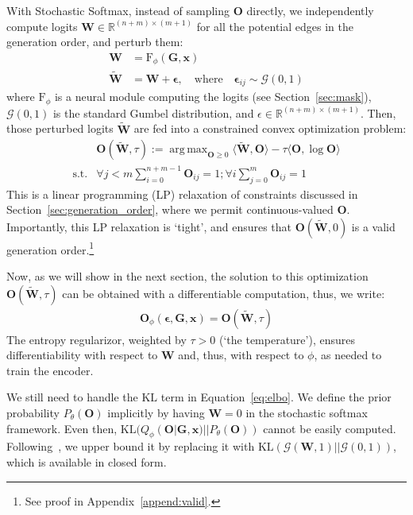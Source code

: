 \documentclass[11pt]{article}
\DeclareMathOperator*{\argmax}{arg\,max}
\begin{document}
With Stochastic Softmax, instead of sampling $\mathbf{O}$ directly, we independently compute logits $\mathbf{W} \in \mathbb{R}^{(n+m)\times(m+1)}$ for  all the potential edges in the generation order, and perturb them:
  \begin{align} \label{eq:logits}
   \mathbf{W} &= \mathrm{F}_\phi(\mathbf{G},\mathbf{x}) \\
  \widetilde{ \mathbf{W}} &=  \mathbf{W} + \mathbf{\epsilon},  \quad  \textrm{where} \quad \mathbf{\epsilon}_{ij} \sim  \mathcal{G}(0,1)
\end{align}
where $\mathrm{F}_\phi$ is a neural module computing the logits (see Section~\ref{sec:mask}), $\mathcal{G}(0,1)$ is the standard Gumbel distribution, and $\epsilon \in \mathbb{R}^{(n+m)\times(m+1)}$. Then, those perturbed logits $\widetilde{ \mathbf{W}}$ are fed into a constrained convex optimization problem:
\begin{align} \label{eq:reg}
  &\mathbf{O}(\widetilde{ \mathbf{W}},\tau) := \argmax_{  \mathbf{O} \geq 0} \langle \widetilde{ \mathbf{W}}, \mathbf{O} \rangle -\tau \langle \mathbf{O}, \log \mathbf{O} \rangle \nonumber \\
    \mbox{s.t.}  &   \forall j < m \sum_{i=0}^{n+m-1} \mathbf{O}_{ij} =1 ;\forall i \sum_{j=0}^{m} \mathbf{O}_{ij} =1
\end{align}
This is a linear programming (LP) relaxation of constraints  discussed in Section~\ref{sec:generation_order}, where we permit continuous-valued  $\mathbf{O}$. Importantly, this LP relaxation is `tight', and ensures that
 $\mathbf{O}(\widetilde{ \mathbf{W}},0) $ is a valid generation order.\footnote{See proof in Appendix~\ref{append:valid}.
 } 


Now, as we will show in the next section,
the solution to this optimization 
$\mathbf{O}(\widetilde{ \mathbf{W}},\tau) $
can be obtained with a differentiable computation,
thus, we write:
\begin{align}
    \mathbf{O}_\phi(\mathbf{\epsilon},\mathbf{G},\mathbf{x}) =\mathbf{O}(\widetilde{ \mathbf{W}},\tau)
\end{align}  
The entropy regularizor, weighted by $\tau>0$ (`the temperature'), ensures differentiability  with respect to $\mathbf{W}$ and, thus, with respect to $\phi$, as needed to train the encoder. 



We still need to handle the $\mathrm{KL}$ term in Equation~\ref{eq:elbo}. We define the prior probability $P_\theta(\mathbf{O})$ implicitly by having $\mathbf{W}=0$ in the stochastic softmax framework. Even then, $\mathrm{KL}(Q_\phi(\mathbf{O}|\mathbf{G},\mathbf{x})|| P_\theta(\mathbf{O}))$ cannot be easily computed. Following~, we upper bound it by replacing it with $\mathrm{KL}(\mathcal{G}(  \mathbf{W},1)||\mathcal{G}(0,1))$, which is available in closed form. 
\end{document}
